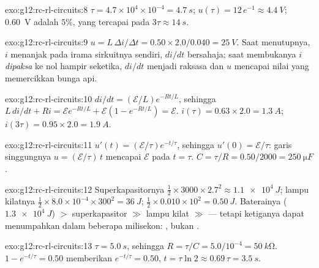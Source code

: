 \begin{solution}{exo:g12:rc-rl-circuits:8}
$\tau = 4.7\times10^{4} \times 10^{-4} = \qty{4.7}{s}$;
$u(\tau) = 12\,e^{-1} \approx \qty{4.4}{V}$; \qty{0.60}{V} adalah $5\%$,
yang tercapai pada $3\tau \approx \qty{14}{s}$.
\end{solution}

\begin{solution}{exo:g12:rc-rl-circuits:9}
$u = L\,\Delta i/\Delta t = 0.50 \times 2.0/0.040 = \qty{25}{V}$.
Saat menutupnya, $i$ menanjak pada irama sirkuitnya sendiri, $di/dt$ bersahaja; saat membukanya
$i$ \emph{dipaksa} ke nol hampir seketika, $di/dt$ menjadi raksasa dan $u$
mencapai nilai yang memercikkan bunga api.
\end{solution}

\begin{solution}{exo:g12:rc-rl-circuits:10}
$di/dt = (\mathcal{E}/L)e^{-Rt/L}$, sehingga $L\,di/dt + Ri =
\mathcal{E}e^{-Rt/L} + \mathcal{E}(1 - e^{-Rt/L}) = \mathcal{E}$.
$i(\tau) = 0.63 \times 2.0 = \qty{1.3}{A}$;
$i(3\tau) = 0.95 \times 2.0 = \qty{1.9}{A}$.
\end{solution}

\begin{solution}{exo:g12:rc-rl-circuits:11}
$u'(t) = (\mathcal{E}/\tau)e^{-t/\tau}$, sehingga $u'(0) = \mathcal{E}/\tau$:
garis singgungnya $u = (\mathcal{E}/\tau)\,t$ mencapai $\mathcal{E}$ pada
$t = \tau$. $C = \tau/R = 0.50/2000 = \qty{250}{\micro F}$.
\end{solution}

\begin{solution}{exo:g12:rc-rl-circuits:12}
Superkapasitornya $\tfrac12 \times 3000 \times 2.7^2 \approx \qty{1.1e4}{J}$;
lampu kilatnya $\tfrac12 \times 8.0\times10^{-4} \times 300^2 = \qty{36}{J}$;
 $\tfrac12 \times 0.010 \times 10^2 = \qty{0.50}{J}$. Baterainya
($\qty{1.3e4}{J}$) $>$ superkapasitor $\gg$ lampu kilat $\gg$  --- tetapi ketiganya
dapat menumpahkan  dalam beberapa milisekon: , bukan .
\end{solution}

\begin{solution}{exo:g12:rc-rl-circuits:13}
$\tau = \qty{5.0}{s}$, sehingga $R = \tau/C = 5.0/10^{-4} = \qty{50}{k\ohm}$.
$1 - e^{-t/\tau} = 0.50$ memberikan $e^{-t/\tau} = 0.50$, $t = \tau\ln 2
\approx 0.69\,\tau = \qty{3.5}{s}$.
\end{solution}


